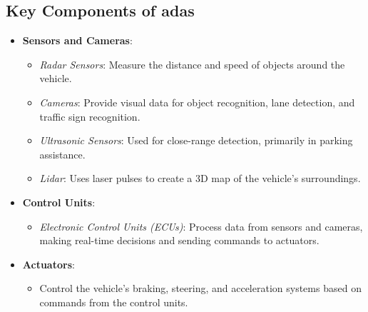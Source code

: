\subsection*{Key Components of \ac{adas}}
\begin{itemize}
    \item \textbf{Sensors and Cameras}:
    \begin{itemize}
        \item \textit{Radar Sensors}: Measure the distance and speed of objects around the vehicle.
        \item \textit{Cameras}: Provide visual data for object recognition, lane detection, and traffic sign recognition.
        \item \textit{Ultrasonic Sensors}: Used for close-range detection, primarily in parking assistance.
        \item \textit{Lidar}: Uses laser pulses to create a 3D map of the vehicle's surroundings.
    \end{itemize}
    
    \item \textbf{Control Units}:
    \begin{itemize}
        \item \textit{Electronic Control Units (ECUs)}: Process data from sensors and cameras, making real-time decisions and sending commands to actuators.
    \end{itemize}
    
    \item \textbf{Actuators}:
    \begin{itemize}
        \item Control the vehicle's braking, steering, and acceleration systems based on commands from the control units.
    \end{itemize}
\end{itemize}
%
